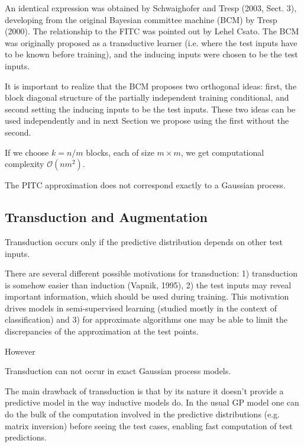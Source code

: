 \documentclass[10pt]{elegantbook}
\begin{document}
An identical expression was obtained by Schwaighofer and Tresp
(2003, Sect. 3), developing from the original Bayesian committee machine (BCM) by Tresp (2000).
The relationship to the FITC was pointed out by Lehel Csato. The BCM was originally proposed as 
a transductive learner (i.e. where the test inputs have to be known before training), and the inducing
inputs were chosen to be the test inputs. 

It is important to realize that the BCM proposes two orthogonal ideas: first, the block diagonal
structure of the partially independent training conditional, and second setting the inducing inputs to
be the test inputs. These two ideas can be used independently and in next Section we propose using
the first without the second.

If we choose $k = n / m $ blocks, each of size $m \times m$, we get computational complexity $\mathcal O(nm^2)$.

\begin{remark}
    The PITC approximation does not correspond exactly to a Gaussian process.
\end{remark}

\subsection{Transduction and Augmentation}
\begin{definition}[Transduction]
    Transduction occurs only if the predictive distribution depends on other test inputs.
\end{definition}

There are several different possible motivations for transduction: 1) transduction is somehow
easier than induction (Vapnik, 1995), 2) the test inputs may reveal important information, which
should be used during training. This motivation drives models in semi-supervised learning (studied
mostly in the context of classification) and 3) for approximate algorithms one may be able to limit
the discrepancies of the approximation at the test points.

However

\begin{remark}
    Transduction can not occur in exact Gaussian process models.
\end{remark}

The main drawback of transduction is that by its nature it doesn’t provide a predictive model
in the way inductive models do. In the usual GP model one can do the bulk of the computation involved in the predictive distributions 
(e.g. matrix inversion) before seeing the test cases, enabling fast computation of test predictions.
\end{document}
